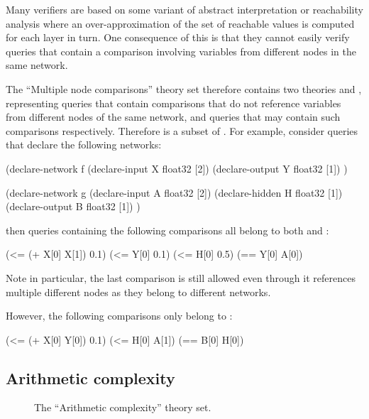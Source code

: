 Many verifiers are based on some variant of abstract interpretation or reachability analysis where an over-approximation of the set of reachable values is computed for each layer in turn.
One consequence of this is that they cannot easily verify queries that contain a comparison involving variables from different nodes in the same network.

The ``Multiple node comparisons'' theory set therefore contains two theories \snc{} and \mnc{}, representing queries that contain comparisons that do not reference variables from different nodes of the same network, and queries that may contain such comparisons respectively. Therefore \snc{} is a subset of \mnc{}. For example, consider queries that declare the following networks:

\begin{code}[style=lbnf]
(declare-network f
    (declare-input  X float32 [2])
    (declare-output Y float32 [1])
)

(declare-network g
    (declare-input  A float32 [2])
    (declare-hidden H float32 [1])
    (declare-output B float32 [1])
)
\end{code}

\noindent then queries containing the following comparisons all belong to both \snc{} and \mnc{}:

\begin{code}[style=lbnf]
(<= (+ X[0] X[1]) 0.1)
(<= Y[0] 0.1)
(<= H[0] 0.5)
(== Y[0] A[0])
\end{code}

\noindent Note in particular, the last comparison is still allowed even through it references multiple different nodes as they belong to different networks. 

However, the following comparisons only belong to \mnc{}:

\begin{code}[style=lbnf]
(<= (+ X[0] Y[0]) 0.1)
(<= H[0] A[1])
(== B[0] H[0])
\end{code}

\subsection{Arithmetic complexity}
\label{sec:arithmetic-complexity}

\begin{figure}[h]
\centering
{}
\caption{The ``Arithmetic complexity'' theory set.}
\label{fig:arithmetic-complexities}
\end{figure}

